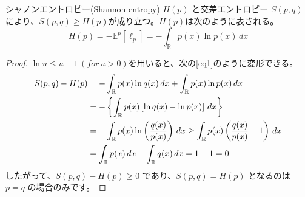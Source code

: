\documentclass[a4paper]{jsarticle}%
\begin{document}
\begin{prop}\label{prop:cross-entropy}
シャノンエントロピー(Shannon-entropy) \footnotemark[2]$H(p)$ と交差エントロピー $S(p, q)$により、$S(p,q)\geq H(p)$が成り立つ。$H(p)$は次のように表される。
\[
H(p) = -\mathbb{E}^p[\ell_p] = - \int_{\mathbb{R}} p(x) \ln p(x) \, dx
\]
\begin{proof}
\footnotemark[3]$\ln u\leq u-1\, (for\, u >0)$を用いると、次の\eqref{eq1}のように変形できる。
\begin{align}
S(p, q) - H(p) &= -\int_{\mathbb{R}} p(x) \ln q(x) \, dx + \int_{\mathbb{R}} p(x) \ln p(x) \, dx \notag\\
&= -\left\{\int_{\mathbb{R}} p(x)\left[\ln q(x)-\ln p(x)\right]\, dx\right\}\notag\\
&= -\int_{\mathbb{R}} p(x)\ln \left(\dfrac{q(x)}{p(x)}\right)\, dx\geq \int_{\mathbb{R}} p(x) \left(\dfrac{q(x)}{p(x)}-1\right)\, dx \label{eq1}\\
&= \int_{\mathbb{R}} p(x)\, dx -\int_{\mathbb{R}} q(x)\, dx =1-1= 0 \notag
\end{align}
したがって、\( S(p, q) - H(p) \geq 0 \) であり、\( S(p, q) = H(p) \) となるのは \( p = q \) の場合のみです。
\end{proof}
\end{prop}
\end{document}
